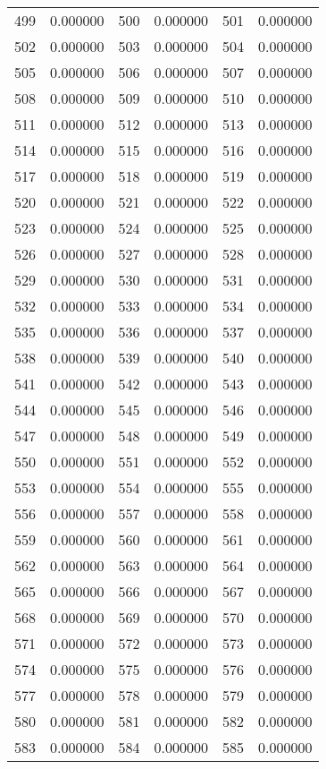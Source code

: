 \documentclass[12pt]{article}
\begin{document}
\begin{longtable}{@{}cc|cc|cc@{}}
499 & 0.000000 & 500 & 0.000000 & 501 & 0.000000 \\
502 & 0.000000 & 503 & 0.000000 & 504 & 0.000000 \\
505 & 0.000000 & 506 & 0.000000 & 507 & 0.000000 \\
508 & 0.000000 & 509 & 0.000000 & 510 & 0.000000 \\
511 & 0.000000 & 512 & 0.000000 & 513 & 0.000000 \\
514 & 0.000000 & 515 & 0.000000 & 516 & 0.000000 \\
517 & 0.000000 & 518 & 0.000000 & 519 & 0.000000 \\
520 & 0.000000 & 521 & 0.000000 & 522 & 0.000000 \\
523 & 0.000000 & 524 & 0.000000 & 525 & 0.000000 \\
526 & 0.000000 & 527 & 0.000000 & 528 & 0.000000 \\
529 & 0.000000 & 530 & 0.000000 & 531 & 0.000000 \\
532 & 0.000000 & 533 & 0.000000 & 534 & 0.000000 \\
535 & 0.000000 & 536 & 0.000000 & 537 & 0.000000 \\
538 & 0.000000 & 539 & 0.000000 & 540 & 0.000000 \\
541 & 0.000000 & 542 & 0.000000 & 543 & 0.000000 \\
544 & 0.000000 & 545 & 0.000000 & 546 & 0.000000 \\
547 & 0.000000 & 548 & 0.000000 & 549 & 0.000000 \\
550 & 0.000000 & 551 & 0.000000 & 552 & 0.000000 \\
553 & 0.000000 & 554 & 0.000000 & 555 & 0.000000 \\
556 & 0.000000 & 557 & 0.000000 & 558 & 0.000000 \\
559 & 0.000000 & 560 & 0.000000 & 561 & 0.000000 \\
562 & 0.000000 & 563 & 0.000000 & 564 & 0.000000 \\
565 & 0.000000 & 566 & 0.000000 & 567 & 0.000000 \\
568 & 0.000000 & 569 & 0.000000 & 570 & 0.000000 \\
571 & 0.000000 & 572 & 0.000000 & 573 & 0.000000 \\
574 & 0.000000 & 575 & 0.000000 & 576 & 0.000000 \\
577 & 0.000000 & 578 & 0.000000 & 579 & 0.000000 \\
580 & 0.000000 & 581 & 0.000000 & 582 & 0.000000 \\
583 & 0.000000 & 584 & 0.000000 & 585 & 0.000000 \\

\end{longtable}
\end{document}
